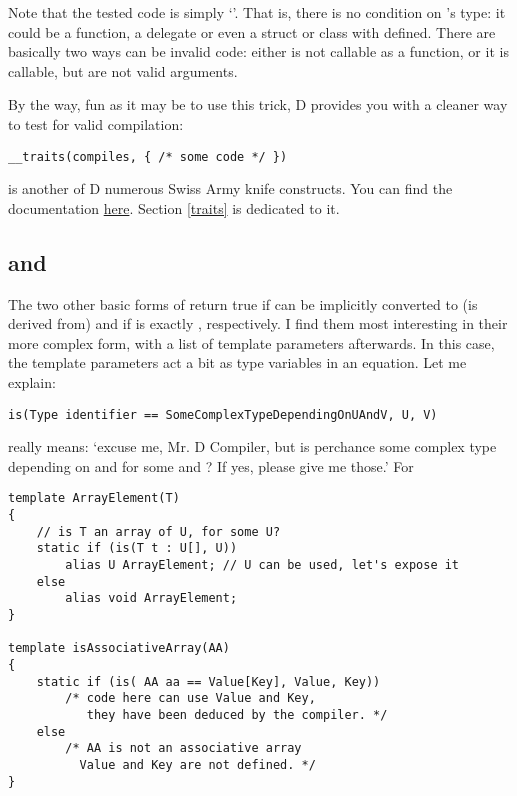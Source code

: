 Note that the tested code is simply `'. That is, there is no condition on 's type: it could be a function, a delegate or even a struct or class with  defined. There are basically two ways  can be invalid code: either  is not callable as a function, or it is callable, but  are not valid arguments.

By the way, fun as it may be to use this trick, D provides you with a cleaner way to test for valid compilation:

\begin{verbatim}
__traits(compiles, { /* some code */ })
\end{verbatim}

 is another of D numerous Swiss Army knife constructs. You can find the  documentation \href{http://www.d-programming-language.org/traits.html#compiles}{here}. Section \ref{traits} is dedicated to it.

\subsection{ and }
\label{istypeanothertype}

The two other basic forms of  return true if  can be implicitly converted to (is derived from)  and if  is exactly , respectively.  I find them most interesting in their more complex form, with a list of template parameters afterwards. In this case, the template parameters act a bit as type variables in an equation. Let me explain:

\begin{verbatim}
is(Type identifier == SomeComplexTypeDependingOnUAndV, U, V)
\end{verbatim}

really means: `excuse me, Mr. D Compiler, but is  perchance some complex type depending on  and  for some  and ? If yes, please give me those.'
For 

\begin{verbatim}
template ArrayElement(T)
{
    // is T an array of U, for some U?
    static if (is(T t : U[], U)) 
        alias U ArrayElement; // U can be used, let's expose it
    else
        alias void ArrayElement;
}

template isAssociativeArray(AA)
{
    static if (is( AA aa == Value[Key], Value, Key))  
        /* code here can use Value and Key, 
           they have been deduced by the compiler. */ 
    else
        /* AA is not an associative array
          Value and Key are not defined. */
}
\end{verbatim}

